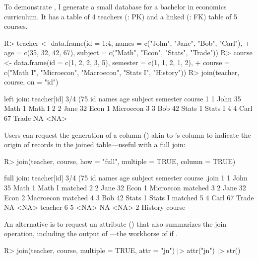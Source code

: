 \documentclass[nojss]{jss} %
\newcommand{\fct}[1]{\code{#1()}}
\begin{document}
To demonstrate \fct{join}, I generate a small database for a bachelor in economics curriculum. It has a  table of 4 teachers (: PK) and a linked (: FK)  table of 5 courses.
%
\begin{Schunk}
\begin{Sinput}
R> teacher <- data.frame(id = 1:4, names = c("John", "Jane", "Bob", "Carl"),
+    age = c(35, 32, 42, 67), subject = c("Math", "Econ", "Stats", "Trade"))
R> course <- data.frame(id = c(1, 2, 2, 3, 5), semester = c(1, 1, 2, 1, 2),
+    course = c("Math I", "Microecon", "Macroecon", "Stats I", "History"))
R> join(teacher, course, on = "id")
\end{Sinput}
\begin{Soutput}
left join: teacher[id] 3/4 (75%) <1:1st> course[id] 3/5 (60%)
  id names age subject semester    course
1  1  John  35    Math        1    Math I
2  2  Jane  32    Econ        1 Microecon
3  3   Bob  42   Stats        1   Stats I
4  4  Carl  67   Trade       NA      <NA>
\end{Soutput}
\end{Schunk}
%
Users can request the generation of a  column () akin to 's  column to indicate the origin of records in the joined table---useful with a full join:
%
\begin{Schunk}
\begin{Sinput}
R> join(teacher, course, how = "full", multiple = TRUE, column = TRUE)
\end{Sinput}
\begin{Soutput}
full join: teacher[id] 3/4 (75%) <1:1.33> course[id] 4/5 (80%)
  id names age subject semester    course   .join
1  1  John  35    Math        1    Math I matched
2  2  Jane  32    Econ        1 Microecon matched
3  2  Jane  32    Econ        2 Macroecon matched
4  3   Bob  42   Stats        1   Stats I matched
5  4  Carl  67   Trade       NA      <NA> teacher
6  5  <NA>  NA    <NA>        2   History  course
\end{Soutput}
\end{Schunk}
%
An alternative is to request an attribute () that also summarizes the join operation, including the output of \fct{fmatch}---the workhorse of \fct{join} if .
\begin{Code}
R> join(teacher, course, multiple = TRUE, attr = "jn") |> attr("jn") |> str()
\end{Code}
\begin{Schunk}
\end{Schunk}
\end{document}
